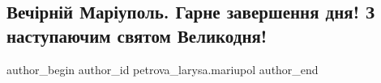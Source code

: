  
 
 
 
 

\subsection{Вечірній Маріуполь. Гарне завершення дня! З наступаючим святом Великодня!}
\label{sec:27_04_2019.fb.petrova_larysa.mariupol.1.vechirnij_mariupol_velykden}

\ifcmt
 author_begin
   author_id petrova_larysa.mariupol
 author_end
\fi

